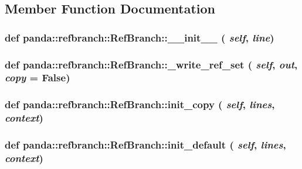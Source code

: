 \subsection{Member Function Documentation}
\hypertarget{classpanda_1_1refbranch_1_1RefBranch_a83802ad57265f711eec821988c6d6975}{
\subsubsection[{\_\-\_\-init\_\-\_\-}]{\setlength{\rightskip}{0pt plus 5cm}def panda::refbranch::RefBranch::\_\-\_\-init\_\-\_\- ( {\em self}, \/   {\em line})}}
\label{classpanda_1_1refbranch_1_1RefBranch_a83802ad57265f711eec821988c6d6975}
\hypertarget{classpanda_1_1refbranch_1_1RefBranch_abe764bb844fed25edac13fa9fa4b27f5}{
\subsubsection[{\_\-write\_\-ref\_\-set}]{\setlength{\rightskip}{0pt plus 5cm}def panda::refbranch::RefBranch::\_\-write\_\-ref\_\-set ( {\em self}, \/   {\em out}, \/   {\em copy} = {\ttfamily False})}}
\label{classpanda_1_1refbranch_1_1RefBranch_abe764bb844fed25edac13fa9fa4b27f5}
\hypertarget{classpanda_1_1refbranch_1_1RefBranch_a0b156c7f55b3ea9ec39f091c2420a88c}{
\subsubsection[{init\_\-copy}]{\setlength{\rightskip}{0pt plus 5cm}def panda::refbranch::RefBranch::init\_\-copy ( {\em self}, \/   {\em lines}, \/   {\em context})}}
\label{classpanda_1_1refbranch_1_1RefBranch_a0b156c7f55b3ea9ec39f091c2420a88c}
\hypertarget{classpanda_1_1refbranch_1_1RefBranch_aeae9c75c06bf44c67bf6ae429edc2f14}{
\subsubsection[{init\_\-default}]{\setlength{\rightskip}{0pt plus 5cm}def panda::refbranch::RefBranch::init\_\-default ( {\em self}, \/   {\em lines}, \/   {\em context})}}
